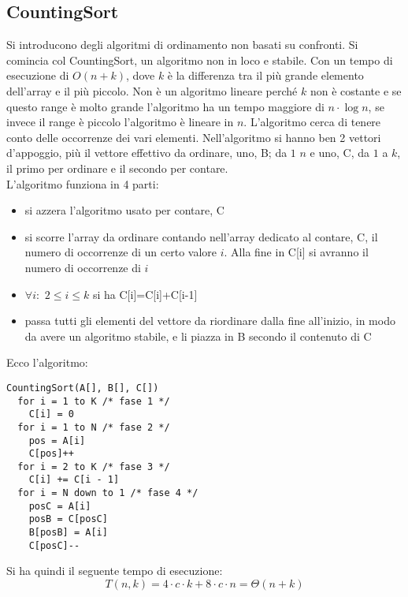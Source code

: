 \documentclass[a4paper,12pt,oneside,tikz]{book}
\begin{document}
\subsection{CountingSort}
Si introducono degli algoritmi di ordinamento non basati su confronti. Si comincia col CountingSort, un algoritmo non in loco e stabile. Con un tempo di esecuzione di $O(n+k)$, dove $k$ è la differenza tra il più grande elemento dell'array e il più piccolo. Non è un algoritmo lineare perché $k$ non è costante e se questo range è molto grande l'algoritmo ha un tempo maggiore di $n\cdot \log n$, se invece il range è piccolo l'algoritmo è lineare in $n$. L'algoritmo cerca di tenere conto delle occorrenze dei vari elementi. Nell'algoritmo si hanno ben 2 vettori d'appoggio, più il vettore effettivo da ordinare, uno, B; da $1$ $n$ e uno, C, da $1$ a $k$, il primo per ordinare e il secondo per contare.\\ L'algoritmo funziona in 4 parti:
\begin{itemize}
\item si azzera l'algoritmo usato per contare, C
\item si scorre l'array da ordinare contando nell'array dedicato al contare, C, il numero di occorrenze di un certo valore $i$. Alla fine in C[i] si avranno il numero di occorrenze di $i$
\item $\forall i:\,\, 2\leq i\leq k$ si ha C[i]=C[i]+C[i-1]
\item passa tutti gli elementi del vettore da riordinare dalla fine all'inizio, in modo da avere un algoritmo stabile, e li piazza in B secondo il contenuto di C 
\end{itemize}
Ecco l'algoritmo:
\begin{verbatim}
CountingSort(A[], B[], C[])
  for i = 1 to K /* fase 1 */
    C[i] = 0
  for i = 1 to N /* fase 2 */
    pos = A[i]
    C[pos]++
  for i = 2 to K /* fase 3 */
    C[i] += C[i - 1]
  for i = N down to 1 /* fase 4 */
    posC = A[i]
    posB = C[posC]
    B[posB] = A[i]
    C[posC]--
\end{verbatim}
Si ha quindi il seguente tempo di esecuzione: 
$$
T(n,k)=4\cdot c \cdot k+8\cdot c\cdot n=\Theta(n+k)$$
\end{document}
